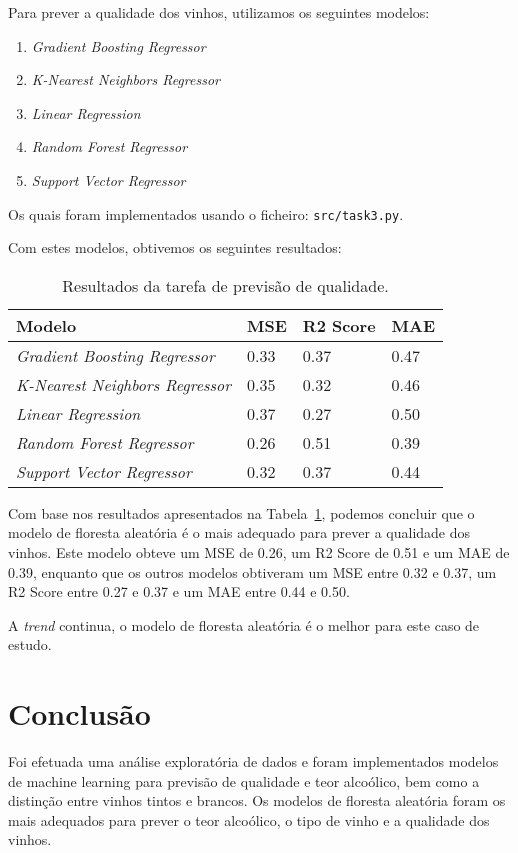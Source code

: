 \documentclass{article}
\begin{document}
Para prever a qualidade dos vinhos, utilizamos os seguintes modelos:

\begin{enumerate}
  \item \textit{Gradient Boosting Regressor}
  \item \textit{K-Nearest Neighbors Regressor}
  \item \textit{Linear Regression}
  \item \textit{Random Forest Regressor}
  \item \textit{Support Vector Regressor}
\end{enumerate}

Os quais foram implementados usando o ficheiro: \texttt{src/task3.py}.

Com estes modelos, obtivemos os seguintes resultados:

\begin{table}[ht]
  \centering
  \begin{tabular}{@{}llll@{}}
    \toprule
    Modelo & MSE & R2 Score & MAE \\ \midrule
    \textit{Gradient Boosting Regressor} & 0.33 & 0.37 & 0.47 \\
    \textit{K-Nearest Neighbors Regressor} & 0.35 & 0.32 & 0.46 \\
    \textit{Linear Regression} & 0.37 & 0.27 & 0.50 \\
    \textit{Random Forest Regressor} & 0.26 & 0.51 & 0.39 \\
    \textit{Support Vector Regressor} & 0.32 & 0.37 & 0.44 \\ \bottomrule
  \end{tabular}
  \caption{Resultados da tarefa de previsão de qualidade.}
  \label{tab:task3_results}
\end{table}

Com base nos resultados apresentados na Tabela~\ref{tab:task3_results}, podemos concluir que o modelo de floresta aleatória é o mais adequado para prever a qualidade dos vinhos. Este modelo obteve um MSE de 0.26, um R2 Score de 0.51 e um MAE de 0.39, enquanto que os outros modelos obtiveram um MSE entre 0.32 e 0.37, um R2 Score entre 0.27 e 0.37 e um MAE entre 0.44 e 0.50.

A \textit{trend} continua, o modelo de floresta aleatória é o melhor para este caso de estudo.

\section{Conclusão}
Foi efetuada uma análise exploratória de dados e foram implementados modelos de machine learning para previsão de qualidade e teor alcoólico, bem como a distinção entre vinhos tintos e brancos. Os modelos de floresta aleatória foram os mais adequados para prever o teor alcoólico, o tipo de vinho e a qualidade dos vinhos.
\end{document}
